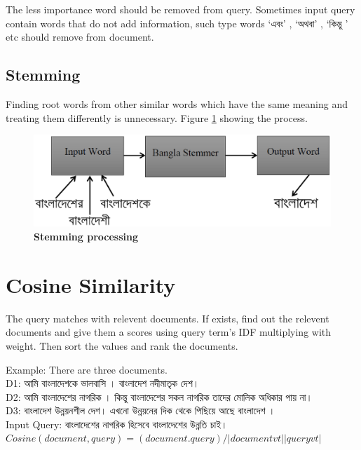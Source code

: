 The less importance word should be removed from query. Sometimes input query contain words that do not add information, such type words {\unicodefont ‘এবং’ , ‘অথবা’ , ‘কিন্তু ’} etc should remove from document.

\subsection{Stemming}

Finding root words from other similar words which have the same meaning and treating them differently is unnecessary. Figure \ref{Figure:stemm} showing the process.

\begin{figure}[htp]
	\centering
		\includegraphics[width=.65\textwidth]{figure/four.eps}
	\caption{\textbf{Stemming processing}}
	\label{Figure:stemm}
\end{figure}


\section{Cosine Similarity}

The query matches with relevent documents. If exists, find out the relevent documents and give them a scores using query term’s IDF multiplying with weight. Then sort the values and rank the documents.

Example:
There are three documents.\\
	D1: {\unicodefont আমি  বাংলাদেশকে ভালবাসি । বাংলাদেশ নদীমাতৃক দেশ।} \\
	D2: {\unicodefont আমি বাংলাদেশের নাগরিক । কিন্তু বাংলাদেশের সকল  নাগরিক তাদের মোলিক অধিকার পায় না। }\\
	D3: {\unicodefont বাংলাদেশ উন্নয়নশীল দেশ। এখনো উন্নয়নের দিক থেকে পিছিয়ে আছে বাংলাদেশ ।  }\\
	
Input Query: {\unicodefont বাংলাদেশের নাগরিক হিসেবে বাংলাদেশের উন্নতি চাই।}\\

\(Cosine(document , query)  = (document . query) / |document vt | |query vt|\)\\


